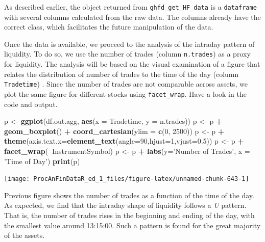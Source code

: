 \documentclass[11pt,]{book}
\newenvironment{Shaded}{\begin{snugshade}}{\end{snugshade}}
\newcommand{\KeywordTok}[1]{\textcolor[rgb]{0.27,0.27,0.27}{\textbf{#1}}}
\newcommand{\DataTypeTok}[1]{\textcolor[rgb]{0.27,0.27,0.27}{#1}}
\newcommand{\DecValTok}[1]{\textcolor[rgb]{0.06,0.06,0.06}{#1}}
\newcommand{\FloatTok}[1]{\textcolor[rgb]{0.06,0.06,0.06}{#1}}
\newcommand{\StringTok}[1]{\textcolor[rgb]{0.5,0.5,0.5}{#1}}
\newcommand{\OperatorTok}[1]{\textcolor[rgb]{0.81,0.36,0.00}{\textbf{#1}}}
\newcommand{\NormalTok}[1]{#1}
\begin{document}
As described earlier, the object returned from
\texttt{ghfd\_get\_HF\_data} is a \texttt{dataframe} with several
columns calculated from the raw data. The columns already have the
correct class, which facilitates the future manipulation of the data.

Once the data is available, we proceed to the analysis of the intraday
pattern of liquidity. To do so, we use the number of trades (column
\texttt{n.trades}) as a proxy for liquidity. The analysis will be based
on the visual examination of a figure that relates the distribution of
number of trades to the time of the day (column \texttt{Tradetime}) .
Since the number of trades are not comparable across assets, we plot the
same figure for different stocks using \texttt{facet\_wrap}. Have a look
in the code and output.

\begin{Shaded}
\begin{Highlighting}[]
\NormalTok{p <-}\StringTok{ }\KeywordTok{ggplot}\NormalTok{(df.out.agg, }\KeywordTok{aes}\NormalTok{(}\DataTypeTok{x =}\NormalTok{  Tradetime, }\DataTypeTok{y =}\NormalTok{ n.trades))}
\NormalTok{p <-}\StringTok{ }\NormalTok{p }\OperatorTok{+}\StringTok{ }\KeywordTok{geom_boxplot}\NormalTok{() }\OperatorTok{+}\StringTok{ }\KeywordTok{coord_cartesian}\NormalTok{(}\DataTypeTok{ylim =} \KeywordTok{c}\NormalTok{(}\DecValTok{0}\NormalTok{, }\DecValTok{2500}\NormalTok{))}
\NormalTok{p <-}\StringTok{ }\NormalTok{p  }\OperatorTok{+}\StringTok{ }\KeywordTok{theme}\NormalTok{(}\DataTypeTok{axis.text.x=}\KeywordTok{element_text}\NormalTok{(}\DataTypeTok{angle=}\DecValTok{90}\NormalTok{,}\DataTypeTok{hjust=}\DecValTok{1}\NormalTok{,}\DataTypeTok{vjust=}\FloatTok{0.5}\NormalTok{))}
\NormalTok{p <-}\StringTok{ }\NormalTok{p }\OperatorTok{+}\StringTok{ }\KeywordTok{facet_wrap}\NormalTok{(}\OperatorTok{~}\NormalTok{InstrumentSymbol)}
\NormalTok{p <-}\StringTok{ }\NormalTok{p }\OperatorTok{+}\StringTok{ }\KeywordTok{labs}\NormalTok{(}\DataTypeTok{y=}\StringTok{'Number of Trades'}\NormalTok{, }\DataTypeTok{x =} \StringTok{'Time of Day'}\NormalTok{)}
\KeywordTok{print}\NormalTok{(p)}
\end{Highlighting}
\end{Shaded}

\begin{center}\texttt{[image: ProcAnFinDataR\_ed\_1\_files/figure-latex/unnamed-chunk-643-1]} \end{center}

Previous figure shows the number of trades as a function of the time of
the day. As expected, we find that the intraday shape of liquidity
follows a \emph{U} pattern. That is, the number of trades rises in the
beginning and ending of the day, with the smallest value around
13:15:00. Such a pattern is found for the great majority of the assets.
\end{document}
